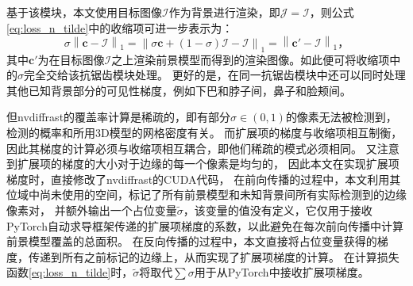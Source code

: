 基于该模块，本文使用目标图像$\mathcal{I}$作为背景进行渲染，即$\mathcal{J}=\mathcal{I}$，则公式\eqref{eq:loss_n_tilde}中的收缩项可进一步表示为：
\begin{equation}
\sigma\left\| \mathbf{c} - \mathcal{I} \right\|_1 =
\left\| \sigma\mathbf{c} + (1-\sigma)\mathcal{I} - \mathcal{I} \right\|_1 =
\left\| \mathbf{c}' - \mathcal{I} \right\|_1
\text{，}
\label{eq:impl_nvdiffrast}
\end{equation}
其中$\mathbf{c}'$为在目标图像$\mathcal{I}$之上渲染前景模型而得到的渲染图像。如此便可将收缩项中的$\sigma$完全交给该抗锯齿模块处理。
更好的是，在同一抗锯齿模块中还可以同时处理其他已知背景部分的可见性梯度，例如下巴和脖子间，鼻子和脸颊间。

但nvdiffrast的覆盖率计算是稀疏的，即有部分$\sigma\in(0,1)$的像素无法被检测到，检测的概率和所用3D模型的网格密度有关。
而扩展项的梯度与收缩项相互制衡，因此其梯度的计算必须与收缩项相互耦合，即他们稀疏的模式必须相同。
又注意到扩展项的梯度的大小对于边缘的每一个像素是均匀的，%
因此本文在实现扩展项梯度时，直接修改了nvdiffrast的CUDA代码，
在前向传播的过程中，本文利用其位域中尚未使用的空间，标记了所有前景模型和未知背景间所有实际检测到的边缘像素对，
并额外输出一个占位变量$\tilde{\sigma}$，该变量的值没有定义，它仅用于接收PyTorch自动求导框架传递的扩展项梯度的系数，以此避免在每次前向传播中计算前景模型覆盖的总面积。
在反向传播的过程中，本文直接将占位变量获得的梯度，传递到所有之前标记的边缘上，从而实现了扩展项梯度的计算。
在计算损失函数\eqref{eq:loss_n_tilde}时，$\tilde{\sigma}$将取代$\sum\sigma$用于从PyTorch中接收扩展项梯度。

